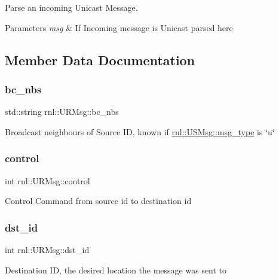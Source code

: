 Parse an incoming Unicast Message. 


\begin{DoxyParams}{Parameters}
{\em msg} & If Incoming message is Unicast parsed here \\
\hline
\end{DoxyParams}


\subsection{Member Data Documentation}
\mbox{\label{structrnl_1_1URMsg_a38fb7f6309191c22846ee787b7d92d07}} 
\subsubsection{\texorpdfstring{bc\+\_\+nbs}{bc\_nbs}}
{\footnotesize\ttfamily std\+::string rnl\+::\+U\+R\+Msg\+::bc\+\_\+nbs}

Broadcast neighbours of Source ID, known if \hyperlink{structrnl_1_1USMsg_a0c4415383a4538f816a5f6c5b3c7bc0c}{rnl\+::\+U\+S\+Msg\+::msg\+\_\+type} is \char`\"{}u\char`\"{} \mbox{\label{structrnl_1_1URMsg_ace6238b8706cceab9ed81420affce197}} 
\subsubsection{\texorpdfstring{control}{control}}
{\footnotesize\ttfamily int rnl\+::\+U\+R\+Msg\+::control}

Control Command from source id to destination id \mbox{\label{structrnl_1_1URMsg_a947b43eec8c0304c471e5260398d6cad}} 
\subsubsection{\texorpdfstring{dst\+\_\+id}{dst\_id}}
{\footnotesize\ttfamily int rnl\+::\+U\+R\+Msg\+::dst\+\_\+id}

Destination ID, the desired location the message was sent to \mbox{\label{structrnl_1_1URMsg_a464d0a68407e00b860a9c3f89ae9bb0f}} 
